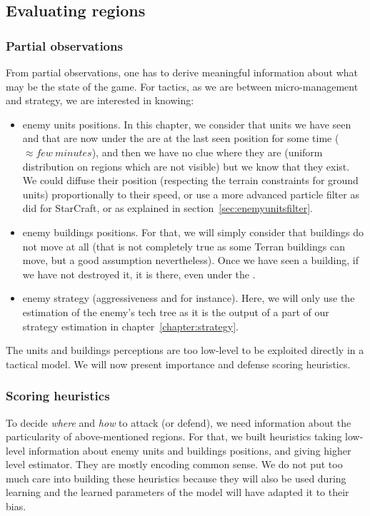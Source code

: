 \subsection{Evaluating regions}
\subsubsection{Partial observations}
From partial observations, one has to derive meaningful information about what may be the state of the game. For tactics, as we are between micro-management and strategy, we are interested in knowing:
\begin{itemize}
    \item enemy units positions. In this chapter, we consider that units we have seen and that are now under the  are at the last seen position for some time ($\approx few\ minutes$), and then we have no clue where they are (uniform distribution on regions which are not visible) but we know that they exist. We could diffuse their position (respecting the terrain constraints for ground units) proportionally to their speed, or use a more advanced particle filter as \cite{weber2011aiide} did for StarCraft, or as explained in section~\ref{sec:enemyunitsfilter}.
    \item enemy buildings positions. For that, we will simply consider that buildings do not move at all (that is not completely true as some Terran buildings can move, but a good assumption nevertheless). Once we have seen a building, if we have not destroyed it, it is there, even under the . 
    \item enemy strategy (aggressiveness and  for instance). Here, we will only use the estimation of the enemy's tech tree as it is the output of a part of our strategy estimation in chapter~\ref{chapter:strategy}.
\end{itemize}
The units and buildings perceptions are too low-level to be exploited directly in a tactical model. We will now present importance and defense scoring heuristics.

\subsubsection{Scoring heuristics}
\label{sec:scoringheuristics}
To decide \textit{where} and \textit{how} to attack (or defend), we need information about the particularity of above-mentioned regions. For that, we built heuristics taking low-level information about enemy units and buildings positions, and giving higher level estimator. They are mostly encoding common sense. We do not put too much care into building these heuristics because they will also be used during learning and the learned parameters of the model will have adapted it to their bias. 

